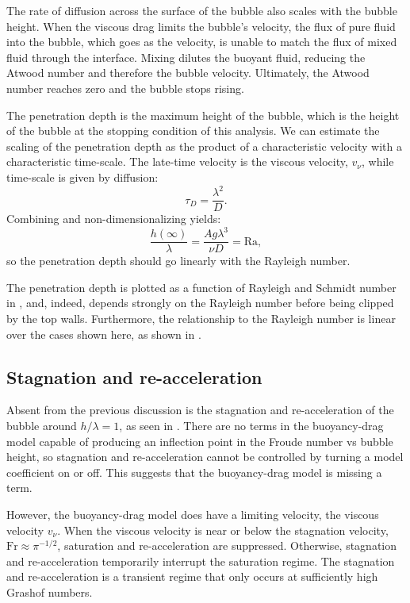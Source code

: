 The rate of diffusion across the surface of the bubble also scales with the bubble height.
When the viscous drag limits the bubble's velocity, the flux of pure fluid into the bubble, which goes as the velocity, is unable to match the flux of mixed fluid through the interface.
Mixing dilutes the buoyant fluid, reducing the Atwood number and therefore the bubble velocity.
Ultimately, the Atwood number reaches zero and the bubble stops rising.

The penetration depth is the maximum height of the bubble, which is the height of the bubble at the stopping condition of this analysis.
We can estimate the scaling of the penetration depth as the product of a characteristic velocity with a characteristic time-scale.
The late-time velocity is the viscous velocity, $v_\nu$, while time-scale is given by diffusion:
\begin{equation}
\tau_D = \frac{\lambda^2}{D}.
\end{equation}
Combining and non-dimensionalizing yields:
\begin{equation}
\frac{h(\infty)}{\lambda} = \frac{A g \lambda^3}{\nu D} = \text{Ra},
\end{equation}
so the penetration depth should go linearly with the Rayleigh number.

The penetration depth is plotted as a function of Rayleigh and Schmidt number in , and, indeed, depends strongly on the Rayleigh number before being clipped by the top walls.
Furthermore, the relationship to the Rayleigh number is linear over the cases shown here, as shown in .

\subsection{Stagnation and re-acceleration}

Absent from the previous discussion is the stagnation and re-acceleration of the bubble around $h / \lambda = 1$, as seen in .
There are no terms in the buoyancy-drag model capable of producing an inflection point in the Froude number vs bubble height, so stagnation and re-acceleration cannot be controlled by turning a model coefficient on or off.
This suggests that the buoyancy-drag model is missing a term.

However, the buoyancy-drag model does have a limiting velocity, the viscous velocity $v_\nu$.
When the viscous velocity is near or below the stagnation velocity, $\text{Fr} \approx \pi^{-1/2}$, saturation and re-acceleration are suppressed.
Otherwise, stagnation and re-acceleration temporarily interrupt the saturation regime.
The stagnation and re-acceleration is a transient regime that only occurs at sufficiently high Grashof numbers.

